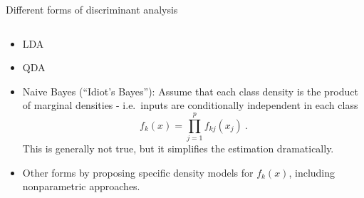 \documentclass[10pt,ignorenonframetext,]{beamer}
\providecommand{\tightlist}{%
  \setlength{\itemsep}{0pt}\setlength{\parskip}{0pt}}
\begin{document}
\begin{frame}

\begin{block}{Different forms of discriminant analysis}

\(~\)

\begin{itemize}
\tightlist
\item
  LDA
\end{itemize}

\vspace{2mm}

\begin{itemize}
\tightlist
\item
  QDA
\end{itemize}

\vspace{2mm}

\begin{itemize}
\tightlist
\item
  Naive Bayes (``Idiot's Bayes''): Assume that each class density is the
  product of marginal densities - i.e.~inputs are conditionally
  independent in each class \[f_k(x)=\prod_{j=1}^p f_{kj}(x_j) \ .\]
  This is generally not true, but it simplifies the estimation
  dramatically.
\end{itemize}

\vspace{2mm}

\begin{itemize}
\tightlist
\item
  Other forms by proposing specific density models for \(f_k(x)\),
  including nonparametric approaches.
\end{itemize}

\end{block}

\end{frame}
\end{document}
